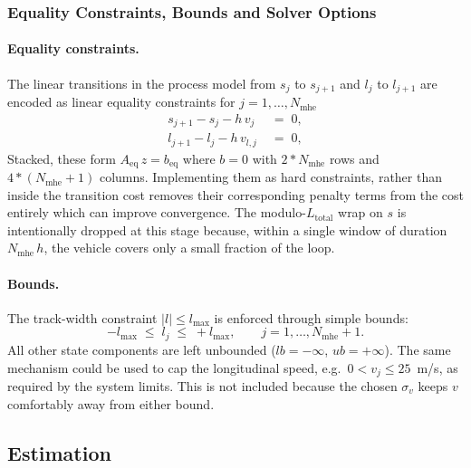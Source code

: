 \subsubsection{Equality Constraints, Bounds and Solver Options}
\label{subsubsec:est_constr}

\paragraph{Equality constraints.}
The linear transitions in the process model from $s_j$ to $s_{j+1}$ and $l_j$ to $l_{j+1}$ are encoded as linear equality constraints for $j = 1,\ldots,N_{\text{mhe}}$
\begin{align}
    s_{j+1} - s_{j} - h\,v_{j} \;&=\; 0, \label{eq:eq_constr_s}\\
    l_{j+1} - l_{j} - h\,v_{l,j} \;&=\; 0, \label{eq:eq_constr_l}
\end{align}
Stacked, these form $A_{\text{eq}}\,z = b_{\text{eq}}$  where $b=0$ with $2*N_{\text{mhe}}$ rows and $4*(N_{\text{mhe}}+1)$ columns. Implementing them as hard constraints, rather than inside the transition cost removes their corresponding penalty terms from the cost entirely which can improve convergence. The modulo-$L_{\text{total}}$ wrap on $s$ is intentionally dropped at this stage because, within a single window of duration $N_{\text{mhe}}\,h$, the vehicle covers only a small fraction of the loop.

\paragraph{Bounds.}
The track-width constraint $|l|\leq l_{\max}$ is enforced through simple bounds:
\begin{equation}
    -l_{\max} \;\leq\; l_{j} \;\leq\; +l_{\max}, \qquad j = 1,\ldots,N_{\text{mhe}}+1.
    \label{eq:est_bounds}
\end{equation}
All other state components are left unbounded ($lb = -\infty$, $ub = +\infty$). The same mechanism could be used to cap the longitudinal speed, e.g.\ $0 < v_{j} \leq 25$~m/s, as required by the system limits. This is not included because the chosen $\sigma_{v}$ keeps $v$ comfortably away from either bound.

\subsection{Estimation}
\label{subsec:est_params}


